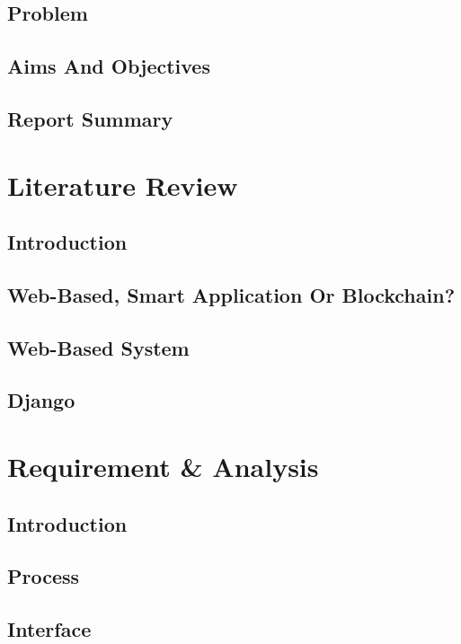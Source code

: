 \documentclass[a4paper,12pt,oneside]{book}
\begin{document}
	\section{Problem}
		
	\section{Aims And Objectives}
		
	\section{Report Summary}
		

\chapter{Literature Review}
	\section{Introduction}
		
	\section{Web-Based, Smart Application Or Blockchain?}
		
	\section{Web-Based System}
		
	\section{Django}
			
		
\chapter{Requirement \& Analysis}
	\section{Introduction}
		
	\section{Process}
		
	\section{Interface}
		
\end{document}
